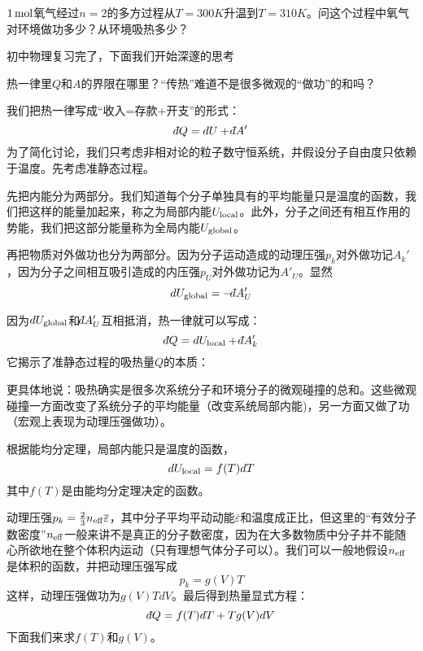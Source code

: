 \documentclass[CJK]{beamer}
\begin{document}
\begin{frame}
\bch
{}
$1\,\mathrm{mol}$氧气经过$n=2$的多方过程从$T=300K$升温到$T=310K$。问这个过程中氧气对环境做功多少？从环境吸热多少？
\ech
\end{frame}


\begin{frame}
\bch
初中物理复习完了，下面我们开始深邃的思考


热一律里$Q$和$A$的界限在哪里？“传热”难道不是很多微观的“做功”的和吗？

\ech
\end{frame}


\begin{frame}
\bch
我们把热一律写成“收入=存款+开支”的形式：
$$ \dbar Q =  d U + \dbar A'$$
为了简化讨论，我们只考虑非相对论的粒子数守恒系统，并假设分子自由度只依赖于温度。先考虑准静态过程。

\skipline

先把内能分为两部分。我们知道每个分子单独具有的平均能量只是温度的函数，我们把这样的能量加起来，称之为{\blue 局部内能$U_{\rm local}$}。此外，分子之间还有相互作用的势能，我们把这部分能量称为{\blue 全局内能$U_{\rm global}$}。


再把物质对外做功也分为两部分。因为分子运动造成的{\blue 动理压强$p_k$对外做功记$ A_k'$}，因为分子之间相互吸引造成的{\blue 内压强$p_U$对外做功记为$ A'_U$}。显然
{\blue
$$ d U_{\rm global} = - \dbar A'_U$$
}
\ech
\end{frame}


\begin{frame}
\bch
因为$d U_{\rm global}$和$\dbar A'_U$互相抵消，热一律就可以写成：
$$ \dbar Q = d U_{\rm local}  +\dbar A'_k  $$
它揭示了准静态过程的吸热量$Q$的本质：


更具体地说：吸热确实是很多次系统分子和环境分子的微观碰撞的总和。这些微观碰撞一方面改变了系统分子的平均能量（改变系统局部内能)，另一方面又做了功（宏观上表现为动理压强做功）。


\ech
\end{frame}

\begin{frame}
\bch
根据能均分定理，{\blue 局部内能只是温度的函数}，
$$d U_{\rm local} = f(T) dT$$
其中$f(T)$是由能均分定理决定的函数。

\skipline

动理压强$p_k = \frac{2}{3}n_{\rm eff}\overline{\varepsilon}$，其中分子平均平动动能$\overline{\varepsilon}$和温度成正比，但这里的“有效分子数密度”$n_{\rm eff}$一般来讲不是真正的分子数密度，因为在大多数物质中分子并不能随心所欲地在整个体积内运动（只有理想气体分子可以）。我们可以一般地假设$n_{\rm eff}$是体积的函数，并把动理压强写成
{\blue
$$ p_k = g(V) T$$}
这样，动理压强做功为$g(V)T dV$。最后得到热量显式方程：$$\dbar Q = f(T)dT + Tg(V) dV$$
下面我们来求$f(T)$和$g(V)$。

\ech
\end{frame}
\end{document}
